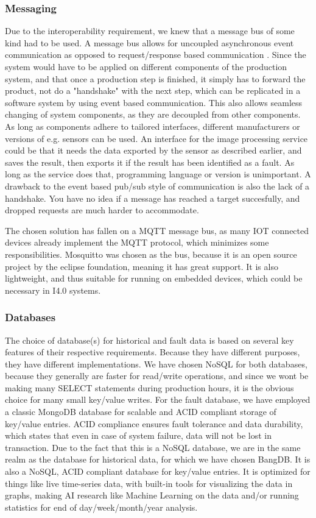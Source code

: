 \subsubsection{Messaging}
Due to the interoperability requirement, we knew that a message bus of some kind had to be used. A message bus allows for uncoupled asynchronous event communication as opposed to request/response based communication \cite{inngest2022}. Since the system would have to be applied on different components of the production system, and that once a production step is finished, it simply has to forward the product, not do a "handshake" with the next step, which can be replicated in a software system by using event based communication. This also allows seamless changing of system components, as they are decoupled from other components. As long as components adhere to tailored interfaces, different manufacturers or versions of e.g. sensors can be used. An interface for the image processing service could be that it needs the data exported by the sensor as described earlier, and saves the result, then exports it if the result has been identified as a fault. As long as the service does that, programming language or version is unimportant. A drawback to the event based pub/sub style of communication is also the lack of a handshake. You have no idea if a message has reached a target succesfully, and dropped requests are much harder to accommodate. 

The chosen solution has fallen on a MQTT message bus, as many IOT connected devices already implement the MQTT protocol, which minimizes some responsibilities. Mosquitto was chosen as the bus, because it is an open source project by the eclipse foundation, meaning it has great support. It is also lightweight, and thus suitable for running on embedded devices, which could be necessary in I4.0 systems.

\subsubsection{Databases}

The choice of database(s) for historical and fault data is based on several key features of their respective requirements. Because they have different purposes, they have different implementations. We have chosen NoSQL for both databases, because they generally are faster for read/write operations, and since we wont be making many SELECT statements during production hours, it is the obvious choice for many small key/value writes. For the fault database, we have employed a classic MongoDB database for scalable and ACID compliant storage of key/value entries. ACID compliance ensures fault tolerance and data durability, which states that even in case of system failure, data will not be lost in transaction. Due to the fact that this is a NoSQL database, we are in the same realm as the database for historical data, for which we have chosen BangDB. It is also a NoSQL, ACID compliant database for key/value entries. It is optimized for things like live time-series data, with built-in tools for visualizing the data in graphs, making AI research like Machine Learning on the data and/or running statistics for end of day/week/month/year analysis.